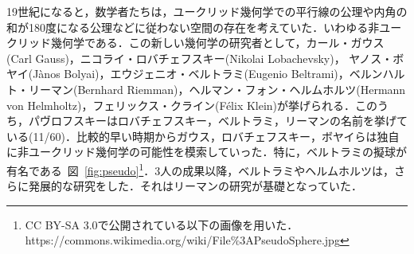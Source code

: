 19世紀になると，数学者たちは，ユークリッド幾何学での平行線の公理や内角の和が180度になる公理などに従わない空間の存在を考えていた．いわゆる非ユークリッド幾何学である．この新しい幾何学の研究者として，カール・ガウス(Carl Gauss)，ニコライ・ロバチェフスキー(Nikolai Lobachevsky)， ヤノス・ボヤイ(Jànos Bolyai)，エウジェニオ・ベルトラミ(Eugenio Beltrami)，ベルンハルト・リーマン(Bernhard Riemman)，ヘルマン・フォン・ヘルムホルツ(Hermann von Helmholtz)，フェリックス・クライン(Félix Klein)が挙げられる．このうち，パヴロフスキーはロバチェフスキー，ベルトラミ，リーマンの名前を挙げている(11/60)．比較的早い時期からガウス，ロバチェフスキー，ボヤイらは独自に非ユークリッド幾何学の可能性を模索していった．特に，ベルトラミの擬球が有名である~図~\ref{fig:pseudo}\footnote{CC BY-SA 3.0で公開されている以下の画像を用いた．https:\slash\slash commons.wikimedia.org\slash wiki\slash File\%3APseudoSphere.jpg}．3人の成果以降，ベルトラミやヘルムホルツは，さらに発展的な研究をした．それはリーマンの研究が基礎となっていた．

